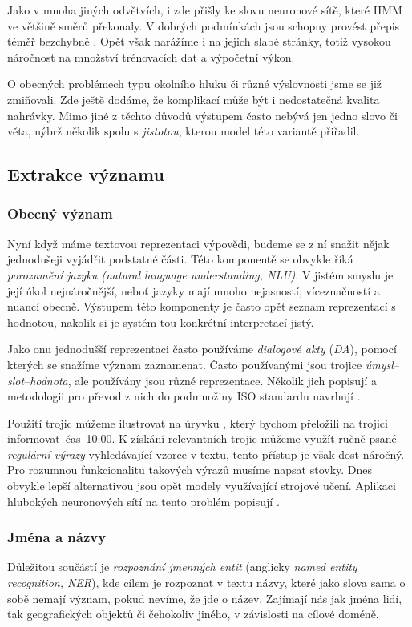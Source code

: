 Jako v mnoha jiných odvětvích, i zde přišly ke slovu neuronové sítě, které HMM
ve většině směrů překonaly. V dobrých podmínkách jsou schopny provést přepis
téměř bezchybně \citep{zhang_pushing_2020}. Opět však narážíme i na jejich slabé stránky,
totiž vysokou náročnost na množství trénovacích dat a výpočetní výkon.

O obecných problémech typu okolního hluku či různé výslovnosti jsme se
již zmiňovali. Zde ještě dodáme, že komplikací může být i nedostatečná kvalita
nahrávky. Mimo jiné z těchto důvodů výstupem často nebývá jen jedno
slovo či věta, nýbrž několik spolu s \textit{jistotou}, kterou model této
variantě přiřadil.

\subsection{Extrakce významu}\label{nlu}

\subsubsection{Obecný význam}
Nyní když máme textovou reprezentaci výpovědi, budeme se z ní snažit nějak
jednodušeji vyjádřit podstatné části. Této komponentě se obvykle říká
\textit{porozumění jazyku (natural language understanding, NLU)}. V jistém
smyslu je její úkol nejnáročnější, neboť jazyky mají mnoho nejasností,
víceznačností a nuancí obecně. Výstupem této komponenty je často opět
seznam reprezentací s hodnotou, nakolik si je systém tou konkrétní
interpretací jistý.

Jako onu jednodušší reprezentaci často používáme \textit{dialogové akty}
(\textit{DA}), pomocí kterých se snažíme význam zaznamenat. Často
používanými jsou trojice \textit{úmysl}--\textit{slot}--\textit{hodnota},
ale používány jsou různé reprezentace. Několik jich popisují a
metodologii pro převod z nich do podmnožiny
ISO standardu navrhují \citet{mezza_iso-standard_2018}.

Použití trojic můžeme ilustrovat na úryvku , který bychom
přeložili na trojici
informovat--čas--10:00. K získání relevantních trojic můžeme využít ručně
psané \textit{regulární výrazy} vyhledávající vzorce v textu, tento přístup
je však dost náročný. Pro rozumnou funkcionalitu takových výrazů musíme napsat
stovky. Dnes obvykle lepší alternativou jsou opět modely využívající strojové
učení. Aplikaci hlubokých neuronových sítí na tento problém
popisují \citet{liu_multi-task_2019}.

\subsubsection{Jména a názvy}
Důležitou součástí je \textit{rozpoznání jmenných entit} (anglicky
\textit{named entity recognition, NER}),
kde cílem je rozpoznat v textu názvy, které jako slova sama o sobě nemají
význam, pokud nevíme, že jde o název. Zajímají nás jak jména lidí, tak
geografických objektů či čehokoliv jiného, v závislosti na cílové doméně.

